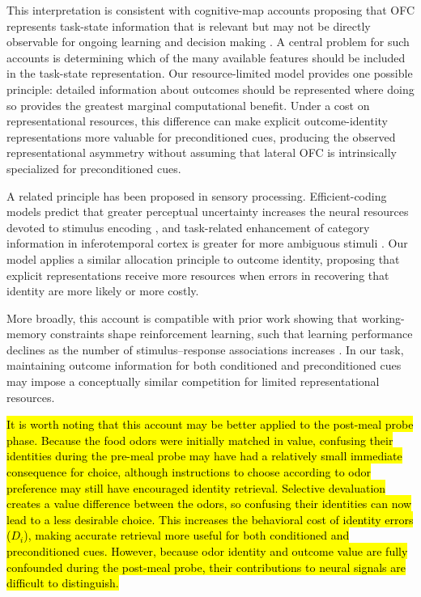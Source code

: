 \documentclass[9pt,twocolumn,twoside]{pnas-new}
\begin{document}
This interpretation is consistent with cognitive-map accounts proposing that OFC represents task-state information that is relevant but may not be directly observable for ongoing learning and decision making \cite{wilson2014orbitofrontal,schuck2016human,niv2019learning}. A central problem for such accounts is determining which of the many available features should be included in the task-state representation. Our resource-limited model provides one possible principle: detailed information about outcomes should be represented where doing so provides the greatest marginal computational benefit. Under a cost on representational resources, this difference can make explicit outcome-identity representations more valuable for preconditioned cues, producing the observed representational asymmetry without assuming that lateral OFC is intrinsically specialized for preconditioned cues.

A related principle has been proposed in sensory processing. Efficient-coding models predict that greater perceptual uncertainty increases the neural resources devoted to stimulus encoding \cite{mlynarski2022efficient}, and task-related enhancement of category information in inferotemporal cortex is greater for more ambiguous stimuli \cite{dehaqani2022neural}. Our model applies a similar allocation principle to outcome identity, proposing that explicit representations receive more resources when errors in recovering that identity are more likely or more costly.

More broadly, this account is compatible with prior work showing that working-memory constraints shape reinforcement learning, such that learning performance declines as the number of stimulus–response associations increases \cite{collins2012much,collins2018tortoise}. In our task, maintaining outcome information for both conditioned and preconditioned cues may impose a conceptually similar competition for limited representational resources.

\hl{It is worth noting that this account may be better applied to the post-meal probe phase. Because the food odors were initially matched in value, confusing their identities during the pre-meal probe may have had a relatively small immediate consequence for choice, although instructions to choose according to odor preference may still have encouraged identity retrieval. Selective devaluation creates a value difference between the odors, so confusing their identities can now lead to a less desirable choice. This increases the behavioral cost of identity errors \mbox{($D_i$)}, making accurate retrieval more useful for both conditioned and preconditioned cues. However, because odor identity and outcome value are fully confounded during the post-meal probe, their contributions to neural signals are difficult to distinguish.}
\end{document}
